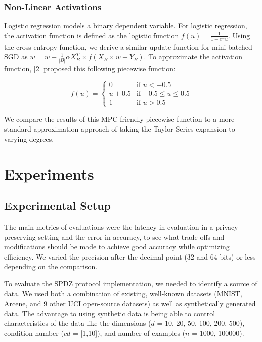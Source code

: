 \documentclass{article}
\begin{document}
\subsubsection{Non-Linear Activations}

Logistic regression models a binary dependent variable. For logistic regression, the activation function is defined as the logistic function $f(u) = \frac{1}{1+e^-u}$. Using the cross entropy function, we derive a similar update function for mini-batched SGD as $ w = w - \frac{1}{|B|} \alpha X^{T}_{B} \times f(X_{B} \times w - Y_{B})$. To approximate the activation function, [2] proposed this following piecewise function:

\[
  f(u) =
  \begin{cases}
                                   0 & \text{if $u < -0.5$} \\
                                   u + 0.5 & \text{if $-0.5 \leq u \leq 0.5$} \\
1 & \text{if $u > 0.5$}
  \end{cases}
\]

We compare the results of this MPC-friendly piecewise function to a more standard approximation approach of taking the Taylor Series expansion to varying degrees.

\section{Experiments}

\subsection{Experimental Setup}

The main metrics of evaluations were the latency in evaluation in a privacy-preserving setting and the error in accuracy, to see what trade-offs and modifications should be made to achieve good accuracy while optimizing efficiency. We varied the precision after the decimal point (32 and 64 bits) or less depending on the comparison.

To evaluate the SPDZ protocol implementation, we needed to identify a source of data. We used both a combination of existing, well-known datasets (MNIST, Arcene, and 9 other UCI open-source datasets) as well as synthetically generated data. The advantage to using synthetic data is being able to control characteristics of the data like the dimensions ($d$ = 10, 20, 50, 100, 200, 500), condition number ($cd$ = [1,10]), and number of examples ($n$ = 1000, 100000).
\end{document}
